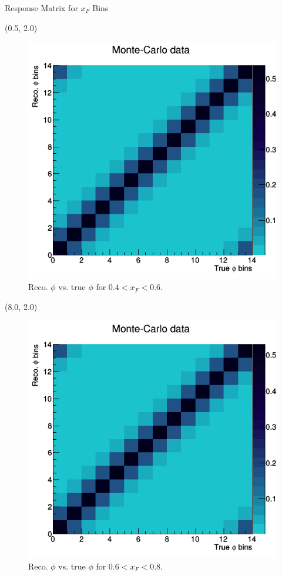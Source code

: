 \documentclass[11pt, xcolor={dvipsnames}, aspectratio = 169]{beamer}
\begin{document}
\begin{frame}{Response Matrix for $x_{F}$ Bins}

\begin{textblock}{7.0}(0.5, 2.0)
\begin{figure}
    \centering
    \includegraphics[width = 1.0\linewidth]{imgs/matrix_xf0.png}
    \caption{Reco. $\phi$ vs. true $\phi$ for $0.4 < x_{F} < 0.6$.}
\end{figure}
\end{textblock}

\begin{textblock}{7.0}(8.0, 2.0)
\begin{figure}
    \centering
    \includegraphics[width = 1.0\linewidth]{imgs/matrix_xf1.png}
    \caption{Reco. $\phi$ vs. true $\phi$ for $0.6 < x_{F} < 0.8$.}
\end{figure}
\end{textblock}

\end{frame}
\end{document}
